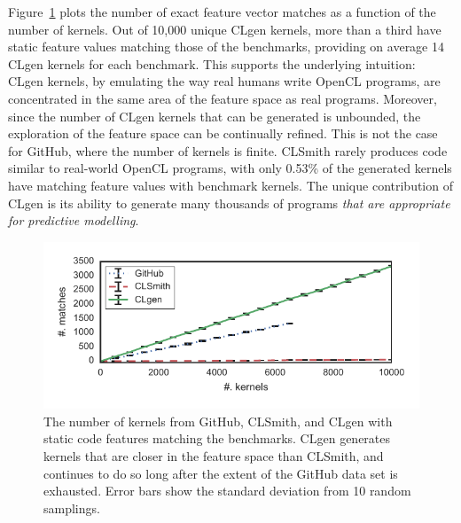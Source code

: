 Figure~\ref{fig:clgen-nearest-neighbour} plots the number of exact feature vector matches as a function of the number of kernels. Out of 10,000 unique CLgen kernels, more than a third have static feature values matching those of the benchmarks, providing on average 14 CLgen kernels for each benchmark. This supports the underlying intuition: CLgen kernels, by emulating the way real humans write OpenCL programs, are concentrated in the same area of the feature space as real programs. Moreover, since the number of CLgen kernels that can be generated is unbounded, the exploration of the feature space can be continually refined. This is not the case for GitHub, where the number of kernels is finite. CLSmith rarely produces code similar to real-world OpenCL programs, with only 0.53\% of the generated kernels have matching feature values with benchmark kernels. The unique contribution of CLgen is its ability to generate many thousands of programs \textit{that are appropriate for predictive modelling}.

\begin{figure}
  \includegraphics[width=\columnwidth]{img/closeness} %
  \caption[Number of kernels matching benchmark features]{%
    The number of kernels from GitHub, CLSmith, and CLgen with static code features matching the benchmarks. CLgen generates kernels that are closer in the feature space than CLSmith, and continues to do so long after the extent of the GitHub data set is exhausted. Error bars show the standard deviation from 10 random samplings.%
  }%
  \label{fig:clgen-nearest-neighbour}
\end{figure}
